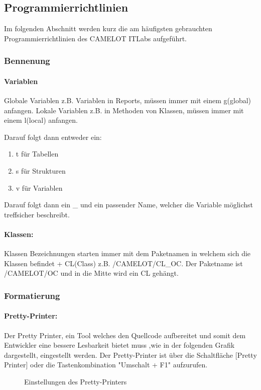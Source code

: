 \subsection{Programmierrichtlinien}
\label{app:Programmierrichtlinien}
Im folgenden Abschnitt werden kurz die am häufigsten gebrauchten Programmierrichtlinien des CAMELOT ITLabs aufgeführt.

\subsubsection{Bennenung}
\label{Bennenung}
\paragraph{Variablen}
Globale Variablen z.B. Variablen in Reports, müssen immer mit einem g(global) anfangen. 
Lokale Variablen z.B. in Methoden von Klassen, müssen immer mit einem l(local) anfangen.

Darauf folgt dann entweder ein:
\begin{enumerate}
	\item t für Tabellen
	\item s für Strukturen
	\item v für Variablen
\end{enumerate}
	
Darauf folgt dann ein \_ und ein passender Name, welcher die Variable möglichst treffsicher beschreibt.

\paragraph{Klassen:}
Klassen Bezeichnungen starten immer mit dem Paketnamen in welchem sich die Klassen befindet + CL(Class) z.B. /CAMELOT/CL\_OC. Der Paketname ist /CAMELOT/OC und in die Mitte wird ein CL gehängt.

\subsubsection{Formatierung}
\label{Formatierung}
\paragraph{Pretty-Printer:}
Der Pretty Printer, ein Tool welches den Quellcode aufbereitet und somit dem Entwickler eine bessere Lesbarkeit bietet muss ,wie in der folgenden Grafik dargestellt, eingestellt werden. Der Pretty-Printer ist über die Schaltfläche [Pretty Printer] oder die Tastenkombination "Umschalt + F1" aufzurufen.
\begin{figure}[htb]
	\centering
	\caption{Einstellungen des Pretty-Printers}
\end{figure}



	

